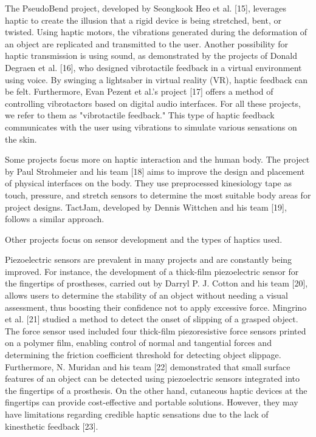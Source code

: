 The PseudoBend project, developed by Seongkook Heo et al. [15], leverages haptic to create the illusion that a rigid device is being stretched, bent, or twisted. Using haptic motors, the vibrations generated during the deformation of an object are replicated and transmitted to the user. Another possibility for haptic transmission is using sound, as demonstrated by the projects of Donald Degraen et al. [16], who designed vibrotactile feedback in a virtual environment using voice. By swinging a lightsaber in virtual reality (VR), haptic feedback can be felt. Furthermore, Evan Pezent et al.'s project [17] offers a method of controlling vibrotactors based on digital audio interfaces. For all these projects, we refer to them as "vibrotactile feedback." This type of haptic feedback communicates with the user using vibrations to simulate various sensations on the skin.

Some projects focus more on haptic interaction and the human body. The project by Paul Strohmeier and his team [18] aims to improve the design and placement of physical interfaces on the body. They use preprocessed kinesiology tape as touch, pressure, and stretch sensors to determine the most suitable body areas for project designs. TactJam, developed by Dennis Wittchen and his team [19], follows a similar approach.

Other projects focus on sensor development and the types of haptics used.

Piezoelectric sensors are prevalent in many projects and are constantly being improved. For instance, the development of a thick-film piezoelectric sensor for the fingertips of prostheses, carried out by Darryl P. J. Cotton and his team [20], allows users to determine the stability of an object without needing a visual assessment, thus boosting their confidence not to apply excessive force. Mingrino et al. [21] studied a method to detect the onset of slipping of a grasped object. The force sensor used included four thick-film piezoresistive force sensors printed on a polymer film, enabling control of normal and tangential forces and determining the friction coefficient threshold for detecting object slippage. Furthermore, N. Muridan and his team [22] demonstrated that small surface features of an object can be detected using piezoelectric sensors integrated into the fingertips of a prosthesis. On the other hand, cutaneous haptic devices at the fingertips can provide cost-effective and portable solutions. However, they may have limitations regarding credible haptic sensations due to the lack of kinesthetic feedback [23].

